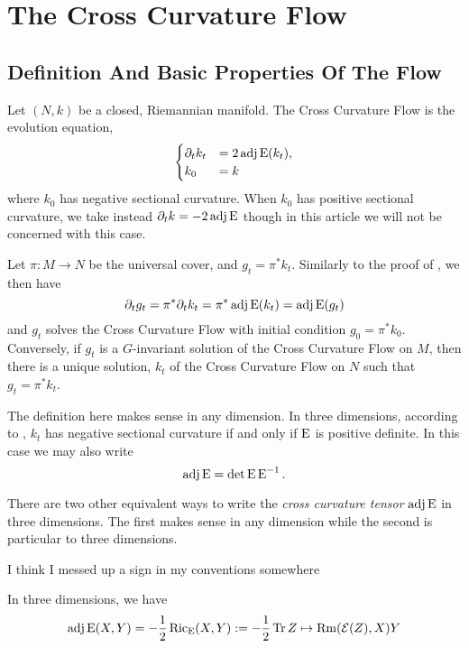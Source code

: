 \documentclass[a4paper, 12pt]{amsart}
\begin{document}
\section{The Cross Curvature Flow}
\label{sec:xcf}

\subsection{Definition And Basic Properties Of  The Flow}
\label{subsec:xcf_defn}

Let \((N, k)\) be a closed, Riemannian manifold. The Cross Curvature Flow is the evolution equation,
\begin{equation}
\label{eq:xcf}
\begin{cases}
\partial_t k_t  &= 2 \operatorname{adj}\operatorname{E}(k_t), \\
k_0 &= k
\end{cases}
\end{equation}
where \(k_0\) has negative sectional curvature. When \(k_0\) has positive sectional curvature, we take instead \(\partial_t k = -2\operatorname{adj}\operatorname{E}\) though in this article we will not be concerned with this case.

\begin{rem}
Let \(\pi : M \to N\) be the universal cover, and \(g_t = \pi^{\ast} k_t\). Similarly to the proof of , we then have
\[
\partial_t g_t = \pi^{\ast} \partial_t k_t = \pi^{\ast} \operatorname{adj}\operatorname{E}(k_t) = \operatorname{adj}\operatorname{E}(g_t)
\]
and \(g_t\) solves the Cross Curvature Flow with initial condition \(g_0 = \pi^{\ast} k_0\). Conversely, if \(g_t\) is a \(G\)-invariant solution of the Cross Curvature Flow on \(M\), then there is a unique solution, \(k_t\) of the Cross Curvature Flow on \(N\) such that \(g_t = \pi^{\ast} k_t\).
\end{rem}

The definition here makes sense in any dimension. In three dimensions, according to , \(k_t\) has negative sectional curvature if and only if \(\operatorname{E}\) is positive definite. In this case we may also write
\[
\operatorname{adj}\operatorname{E} = \det \operatorname{E} \operatorname{E}^{-1}.
\]

There are two other equivalent ways to write the \emph{cross curvature tensor} \(\operatorname{adj}\operatorname{E}\) in three dimensions. The first makes sense in any dimension while the second is particular to three dimensions.

{\color{red} I think I messed up a sign in my conventions somewhere}

\begin{lemma}
\label{eq:xcf_equiv}
In three dimensions, we have
\[
\operatorname{adj}\operatorname{E}(X, Y) = -\frac{1}{2} \operatorname{Ric}_{\operatorname{E}} (X, Y) := -\frac{1}{2} \operatorname{Tr} Z \mapsto \operatorname{Rm}(\operatorname{\mathcal{E}}(Z), X) Y
\]
\end{lemma}
\end{document}
